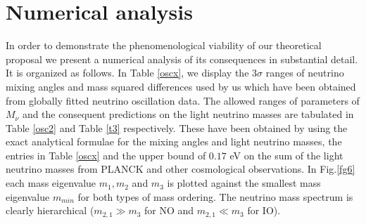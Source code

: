 \documentclass[11pt]{article}
\begin{document}


\section{Numerical analysis}\label{sec4} In order to demonstrate the phenomenological viability of our theoretical proposal we present a numerical analysis of its consequences in substantial detail. It is organized as follows. In Table \ref{oscx}, we display  the $3\sigma$ ranges of neutrino mixing angles and mass squared differences used by us which have been obtained from globally fitted neutrino oscillation data\cite{Esteban:2016qun}. The allowed ranges of parameters of $M_\nu$ and the consequent predictions on the light neutrino masses are tabulated in Table \ref{osc2} and Table \ref{t3} respectively. These have been obtained by using the exact analytical formulae for the mixing angles and light neutrino masses\cite{Adhikary:2013bma}, the entries in Table \ref{oscx} and the upper bound\cite{Aghanim:2016yuo} of $0.17$ eV on the sum of the light neutrino masses from PLANCK and other cosmological observations. In Fig.\ref{fg6} each mass eigenvalue $m_{1}, m_2$ and $m_3$ is plotted against the smallest mass eigenvalue $m_{min}$ for both types of mass ordering. The neutrino mass spectrum is clearly hierarchical ($m_{2,1}\gg m_3$ for NO and $m_{2,1}\ll m_3$ for IO).
\end{document}

